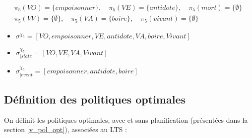 \begin{itemize}
     \begin{minipage}{0.3\textwidth}
        \begin{align*}
            &\pi_5(VO)= \{empoisonner\}, \quad \pi_5(VE)= \{antidote\}, \quad \pi_5(mort)=\{\emptyset\} \quad \\ 
            &\pi_5(VV) = \{\emptyset\},\quad \pi_5(VA) = \{boire\},\quad \pi_5(vivant)=\{\emptyset\}
        \end{align*}
         \begin{itemize}
             \item $\sigma^{\chi_5}= [VO,empoisonner,VE,antidote,VA,boire,Vivant]$ 
             \item  $\sigma^{\chi_5}_{|state}=[VO,VE,VA,Vivant]$
             \item $\sigma^{\chi_5}_{|event}=[empoisonner,antidote,boire]$
         \end{itemize}         
     \end{minipage}
     \begin{minipage}{0.45\textwidth}
     \end{minipage}
\end{itemize}

\subsection{Définition des politiques optimales}\label{pol_opti}

On définit les politiques optimales, avec et sans planification (présentées dans la section \ref{v_pol_opt}), associées au LTS :  

